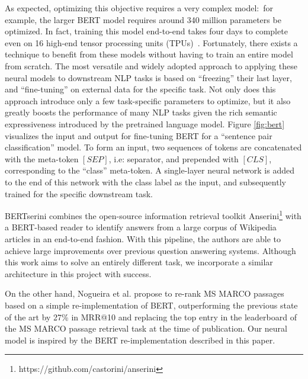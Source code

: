 As expected, optimizing this objective requires a very complex model:\ for example, the larger BERT model requires around 340 million parameters be optimized.
In fact, training this model end-to-end takes four days to complete even on 16 high-end tensor processing units (TPUs)~\cite{devlin2018bert}.
Fortunately, there exists a technique to benefit from these models without having to train an entire model from scratch.
The most versatile and widely adopted approach to applying these neural models to downstream NLP tasks is based on ``freezing'' their last layer, and ``fine-tuning'' on external data for the specific task.
Not only does this approach introduce only a few task-specific parameters to optimize, but it also greatly boosts the performance of many NLP tasks given the rich semantic expressiveness introduced by the pretrained language model.
Figure \ref{fig:bert} visualizes the input and output for fine-tuning BERT for a ``sentence pair classification'' model.
To form an input, two sequences of tokens are concatenated with the meta-token $[SEP]$, i.e: separator, and prepended with $[CLS]$, corresponding to the ``class'' meta-token.
A single-layer neural network is added to the end of this network with the class label as the input, and subsequently trained for the specific downstream task.




BERTserini \cite{Yang_etal_arXiv2019} combines the open-source information retrieval toolkit Anserini\footnote{https://github.com/castorini/anserini} with a BERT-based reader to identify answers from a large corpus of Wikipedia articles in an end-to-end fashion.
With this pipeline, the authors are able to achieve large improvements over previous question answering systems.
Although this work aims to solve an entirely different task, we incorporate a similar architecture in this project with success.

On the other hand, Nogueira et al. \cite{nogueira2019passage} propose to re-rank MS MARCO passages based on a simple re-implementation of BERT, outperforming the previous state of the art by 27\% in MRR@10 and replacing the top entry in the leaderboard of the MS MARCO passage retrieval task at the time of publication.
Our neural model is inspired by the BERT re-implementation described in this paper.

